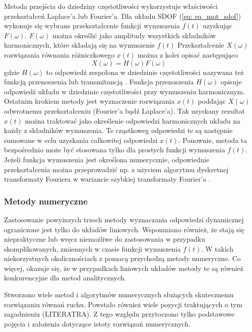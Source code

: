 Metoda przejścia do dziedziny częstotliwości  wykorzystuje właściwości przekształceń Laplace'a lub Fourier'a. Dla układu SDOF (\ref{eq: eq_mot_sdof}) wykonuje się wybrane przekształcenie funkcji wymuszenia $f(t)$ uzyskując $F(\omega)$. $F(\omega)$ można określić jako amplitudy wszystkich składników harmonicznych, które składają się na wymuszenie $f(t)$ Przekształcenie $X(\omega)$ rozwiązania równania różniczkowego $x(t)$ można z kolei opisać następująco
\begin{equation}
	X(\omega)=H(\omega)F(\omega)
\end{equation}
gdzie $H(\omega)$ to odpowiedź zespolona w dziedzinie częstotliwości nazywana też funkcją przenoszenia lub transmitancją . Funkcja przenoszenia $H(\omega)$ opisuje odpowiedź układu w dziedzinie częstotliwości przy wymuszeniu harmonicznym. Ostatnim krokiem metody jest wyznaczenie rozwiązania $x(t)$ poddając $X(\omega)$ odwrotnemu przekształceniu (Fourier'a bądź Laplace'a). Tak uzyskany rezultat $x(t)$ można traktować jako określenie odpowiedzi harmonicznych układu na każdy z składników wymuszenia. Te cząstkoweg odpowiedzi te są następnie sumowane w celu uzyskania całkowitej odpowiedzi $x(t)$. Ponownie, metoda ta bezpośrednio może być stosowana tylko dla prostych funkcji wymuszenia $f(t)$. Jeżeli funkcja wymuszenia jest określona numerycznie, odpowiednie przekształcenia można przeprowadzić np. z użyciem algorytmu dyskretnej transformaty Fouriera w wariancie szybkiej transformaty Fourier'a .

\subsubsection{Metody numeryczne}

Zastosowanie powyższych trzech metody wyznaczania odpowiedzi dynamicznej ograniczone jest tylko do układów liniowych. Wspomniano również, że stają się niepraktyczne lub wręcz niemożliwe do zastosowania w przypadku skomplikowanych, zmiennych w czasie funkcji wymuszenia $f(t)$. W takich niekorzystnych okolicznościach z pomocą przychodzą metody numeryczne. Co więcej, okazuje się, że w przypadkach liniowych układów metody te są również konkurencyjne dla metod analitycznych. 

Stworzono wiele metod i algorytmów numerycznych służących skutecznemu rozwiązaniu równań ruchu. Powstało również wiele pozycji traktujących o tym zagadnieniu (LITERATRA). Z tego względu przytoczono tylko podstawowe pojęcia i założenia dotyczące istoty rozwiązań numerycznych.

